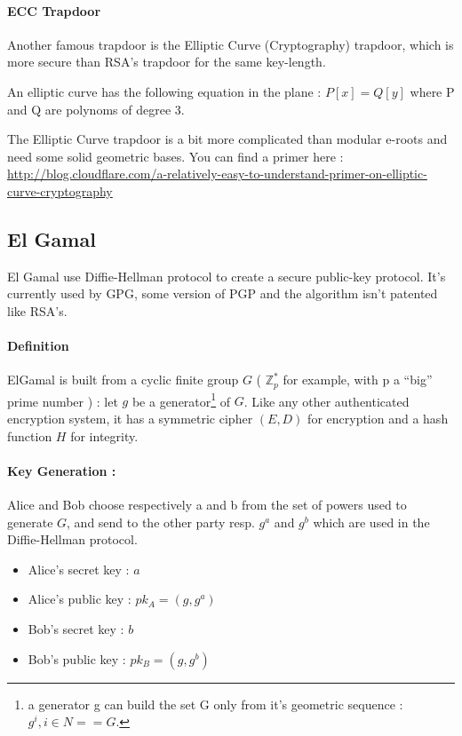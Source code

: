 \paragraph{ECC Trapdoor}

Another famous trapdoor is the Elliptic Curve (Cryptography) trapdoor, which is more secure than RSA's trapdoor for the same key-length. \\

\begin{mydef}
An elliptic curve has the following equation in the plane : $P[x] = Q[y]$ where P and Q are polynoms of degree 3.
\end{mydef}

The Elliptic Curve trapdoor is a bit more complicated than modular e-roots and need some solid geometric bases. You can find a primer here : \url{http://blog.cloudflare.com/a-relatively-easy-to-understand-primer-on-elliptic-curve-cryptography}


\subsection{El Gamal}

El Gamal use Diffie-Hellman protocol to create a secure public-key protocol. It's currently used by GPG, some version of PGP and the algorithm isn't patented like RSA's. 

\paragraph{Definition \\}

ElGamal is built from a cyclic finite group $G$ ( $\mathbb{Z}_p^*$ for example, with p a ``big'' prime number ) : let $g$ be a generator\footnote{a generator g can build the set G only from it's geometric sequence : ${g^i, i\in N} == G$.}  of $G$. Like any other authenticated encryption system, it has a symmetric cipher $(E,D)$ for encryption and a hash function $H$ for integrity.

\paragraph{Key Generation :}
 Alice and Bob choose respectively a and b from the set of powers used to generate $G$, and send to the other party resp. $g^a$ and $g^b$ which are used in the Diffie-Hellman protocol. 
 
\begin{itemize}
	\item Alice's secret key : $a$
	\item Alice's public key : $pk_A = (g, g^a)$
	\item Bob's secret key : $b$
	\item Bob's public key : $pk_B = (g, g^b)$
\end{itemize}
 
